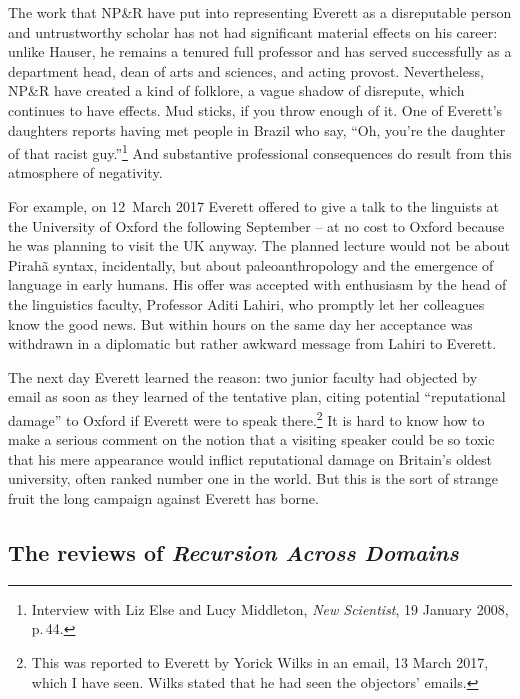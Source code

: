 \documentclass[output=paper,colorlinks,citecolor=brown
]{langscibook}
\begin{document}
The work that NP\&R have put into representing Everett as a disreputable
person and untrustworthy scholar has not had significant material effects
on his career: unlike Hauser, he remains a tenured full professor and has
served successfully as a department head, dean of arts and sciences, and
acting provost. Nevertheless, NP\&R have created a kind of folklore, a
vague shadow of disrepute, which continues to have effects. Mud sticks,
if you throw enough of it. One of Everett's daughters reports having met
people in Brazil who say, ``Oh, you're the daughter of that racist
guy.''\footnote{%
   Interview with Liz Else and Lucy Middleton, \textit{New Scientist},
   19 January 2008, p.\,44.}
And substantive professional consequences do result from this atmosphere
of negativity.

For example, on 12~March 2017 Everett offered to give a talk to the
linguists at the University of Oxford the following September -- at
no cost to Oxford because he was planning to visit the UK anyway. The
planned lecture would not be about Pirahã syntax, incidentally,
but about paleoanthropology and the emergence of language in early
humans. His offer was accepted with enthusiasm by the head of the
linguistics faculty, Professor Aditi Lahiri, who promptly let her
colleagues know the good news. But within hours on the same day her
acceptance was withdrawn in a diplomatic but rather awkward message
from Lahiri to Everett.

The next day Everett learned the reason: two junior faculty had
objected by email as soon as they learned of the tentative plan,
citing potential ``reputational damage'' to Oxford if Everett were to
speak there.\footnote{%
   This was reported to Everett by Yorick Wilks in an email,
   13 March 2017, which I have seen. Wilks stated that he had seen
   the objectors' emails.}
It is hard to know how to make a serious comment on the notion that
a visiting speaker could be so toxic that his mere appearance would
inflict reputational damage on Britain's oldest university, often
ranked number one in the world. But this is the sort of strange fruit
the long campaign against Everett has borne.

\subsection{The reviews of \textit{Recursion Across Domains}}\largerpage
\end{document}
